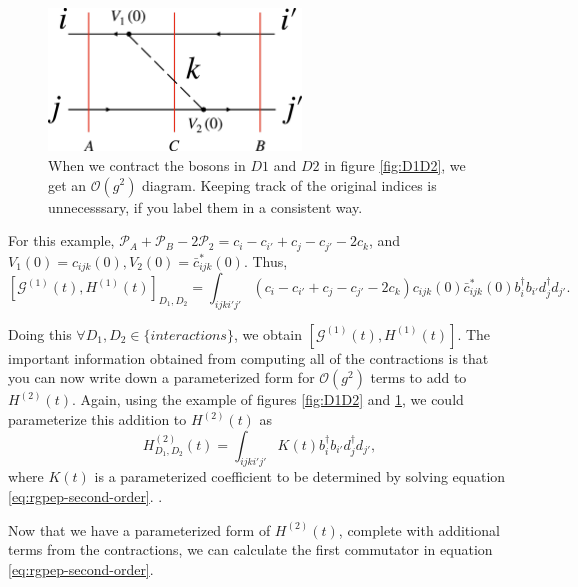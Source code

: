 \begin{figure}
    \includegraphics[width = 0.6\textwidth]{figures/contraction.pdf}
    \caption{When we contract the bosons in $D1$ and $D2$ in figure \ref{fig:D1D2}, we get an $\mathcal{O}(g^2)$ diagram. Keeping track of the original indices is unnecesssary, if you label them in a consistent way.}
    \label{fig:contraction}
\end{figure}

For this example, $\mathcal{P}_A + \mathcal{P}_B - 2\mathcal{P}_2 = c_i - c_{i'} + c_j - c_{j'} - 2c_k$, and $V_1(0) = c_{ijk}(0), V_2(0) = \bar c^*_{ijk}(0)$. Thus, $$\left[\mathcal{G}^{(1)}(t), H^{(1)}(t) \right]_{D_1, D_2} = \int_{ijki'j'}\left(c_i - c_{i'} + c_j - c_{j'} - 2c_k \right)c_{ijk}(0)\bar c^*_{ijk}(0) b_i^\dagger b_{i'}d_j^\dagger d_{j'}.$$

Doing this $\forall D_1, D_2 \in \{interactions\}$, we obtain $\left[\mathcal{G}^{(1)}(t), H^{(1)}(t) \right]$. 
The important information obtained from computing all of the contractions is that you can now write down a parameterized form for $\mathcal{O}(g^2)$ terms to add to $H^{(2)}(t)$. 
Again, using the example of figures \ref{fig:D1D2} and \ref{fig:contraction}, we could parameterize this addition to $H^{(2)}(t)$ as $$H^{(2)}_{D_1, D_2}(t) = \int_{ijki'j'}K(t)  b_i^\dagger b_{i'}d_j^\dagger d_{j'},$$ where $K(t)$ is a parameterized coefficient to be determined by solving equation \ref{eq:rgpep-second-order}. .

Now that we have a parameterized form of $H^{(2)}(t)$, complete with additional terms from the contractions, we can calculate the first commutator in equation \ref{eq:rgpep-second-order}.
